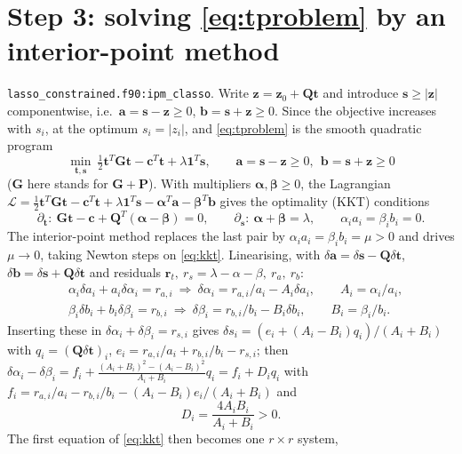 \documentclass[11pt,a4paper]{article}
\newcommand{\bG}{\mathbf G}
\newcommand{\bP}{\mathbf P}
\newcommand{\bQ}{\mathbf Q}
\newcommand{\bc}{\mathbf c}
\newcommand{\bs}{\mathbf s}
\newcommand{\bt}{\mathbf t}
\newcommand{\bz}{\mathbf z}
\newcommand{\code}[1]{\texttt{#1}}
\begin{document}
\section{Step 3: solving \eqref{eq:tproblem} by an interior-point method}\label{sec:ipm}
\code{lasso\_constrained.f90:ipm\_classo}. Write $\bz=\bz_0+\bQ\bt$ and introduce $\bs\ge|\bz|$ componentwise, i.e.\
$\mathbf a=\bs-\bz\ge0$, $\mathbf b=\bs+\bz\ge0$. Since the objective increases with $s_i$, at the optimum $s_i=|z_i|$, and
\eqref{eq:tproblem} is the smooth quadratic program
\begin{equation}
\min_{\bt,\bs}\ \tfrac12\bt^T\bG\bt-\bc^T\bt+\lambda\mathbf 1^T\bs,\qquad\mathbf a=\bs-\bz\ge0,\ \ \mathbf b=\bs+\bz\ge0
\end{equation}
($\bG$ here stands for $\bG+\bP$). With multipliers $\boldsymbol\alpha,\boldsymbol\beta\ge0$, the Lagrangian
$\mathcal L=\tfrac12\bt^T\bG\bt-\bc^T\bt+\lambda\mathbf 1^T\bs-\boldsymbol\alpha^T\mathbf a-\boldsymbol\beta^T\mathbf b$ gives the optimality (KKT) conditions
\begin{equation}\label{eq:kkt}
\partial_{\bt}:\ \bG\bt-\bc+\bQ^T(\boldsymbol\alpha-\boldsymbol\beta)=0,\qquad
\partial_{\bs}:\ \boldsymbol\alpha+\boldsymbol\beta=\lambda,\qquad
\alpha_ia_i=\beta_ib_i=0 .
\end{equation}
The interior-point method replaces the last pair by $\alpha_ia_i=\beta_ib_i=\mu>0$ and drives $\mu\to0$, taking Newton
steps on \eqref{eq:kkt}. Linearising, with $\delta\mathbf a=\delta\bs-\bQ\delta\bt$, $\delta\mathbf b=\delta\bs+\bQ\delta\bt$
and residuals $\mathbf r_t,\ r_s=\lambda-\alpha-\beta,\ r_a,\ r_b$:
\begin{align*}
&\alpha_i\delta a_i+a_i\delta\alpha_i=r_{a,i}\ \Rightarrow\ \delta\alpha_i=r_{a,i}/a_i-A_i\delta a_i,\qquad A_i=\alpha_i/a_i,\\
&\beta_i\delta b_i+b_i\delta\beta_i=r_{b,i}\ \Rightarrow\ \delta\beta_i=r_{b,i}/b_i-B_i\delta b_i,\qquad B_i=\beta_i/b_i .
\end{align*}
Inserting these in $\delta\alpha_i+\delta\beta_i=r_{s,i}$ gives $\delta s_i=(e_i+(A_i-B_i)q_i)/(A_i+B_i)$ with $q_i=(\bQ\delta\bt)_i$,
$e_i=r_{a,i}/a_i+r_{b,i}/b_i-r_{s,i}$; then
$\delta\alpha_i-\delta\beta_i=f_i+\frac{(A_i+B_i)^2-(A_i-B_i)^2}{A_i+B_i}q_i=f_i+D_iq_i$ with
$f_i=r_{a,i}/a_i-r_{b,i}/b_i-(A_i-B_i)e_i/(A_i+B_i)$ and
\begin{equation}
D_i=\frac{4A_iB_i}{A_i+B_i}>0 .
\end{equation}
The first equation of \eqref{eq:kkt} then becomes one $r\times r$ system,
\end{document}
